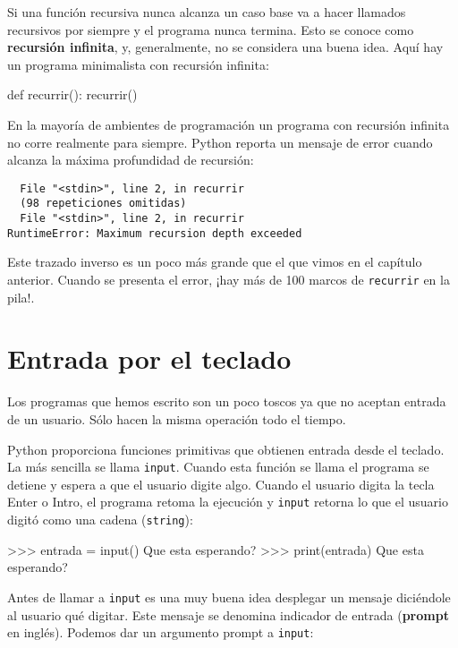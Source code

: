   
 

Si una función recursiva nunca alcanza un caso base va a hacer llamados
recursivos por siempre y el programa nunca termina. Esto se conoce
como \textbf{recursión infinita}, y, generalmente, no se considera
una buena idea. Aquí hay un programa minimalista con recursión infinita:

\begin{pythoncode}
def recurrir():
  recurrir()
\end{pythoncode}
 En la mayoría de ambientes de programación un programa con recursión
infinita no corre realmente para siempre. Python reporta un mensaje
de error cuando alcanza la máxima profundidad de recursión:
\begin{verbatim}
  File "<stdin>", line 2, in recurrir
  (98 repeticiones omitidas)
  File "<stdin>", line 2, in recurrir
RuntimeError: Maximum recursion depth exceeded
\end{verbatim}
Este trazado inverso es un poco más grande que el que vimos en el
capítulo anterior. Cuando se presenta el error, ¡hay más de 100 marcos
de \texttt{recurrir} en la pila!.

\section{Entrada por el teclado}

Los programas que hemos escrito son un poco toscos ya que no aceptan
entrada de un usuario. Sólo hacen la misma operación todo el tiempo.

Python proporciona funciones primitivas que obtienen entrada desde
el teclado. La más sencilla se llama \texttt{input}. Cuando esta
función se llama el programa se detiene y espera a que el usuario
digite algo. Cuando el usuario digita la tecla Enter o Intro, el programa
retoma la ejecución y \texttt{input} retorna lo que el usuario
digitó como una cadena (\texttt{string}):

\begin{pyconcode}
>>> entrada = input()
Que esta esperando?
>>> print(entrada)
Que esta esperando?
\end{pyconcode}
 Antes de llamar a \texttt{input} es una muy buena idea desplegar
un mensaje diciéndole al usuario qué digitar. Este mensaje se denomina
indicador de entrada (\textbf{prompt} en inglés). Podemos dar un argumento
prompt a \texttt{input}:

